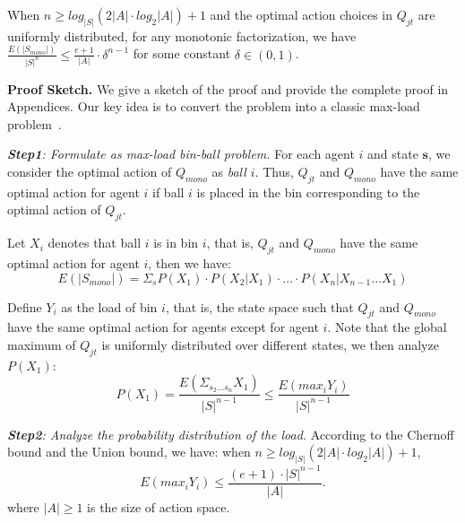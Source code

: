 {
\begin{theorem}
 When $n \geq log_{|S|}(2|A|\cdot log_2|A|) + 1$ and the optimal action choices in $Q_{jt}$ are uniformly distributed, for any monotonic factorization, we have
$\frac{E(|S_{mono}|)}{|S|^n} \leq \frac{e+1}{|A|}\cdot \delta^{n-1}$ for some constant $\delta\in(0,1)$.
\end{theorem}



\noindent\textbf{Proof  Sketch.} We give a sketch of the proof and provide the complete proof in Appendices. Our key idea is to convert the problem into a classic max-load problem~\cite{balls_into_bins}.

\noindent \textit{\textbf{Step1}: Formulate as max-load bin-ball problem.} For each agent $i$ and state $\mathbf{s}$, we consider the optimal action of $Q_{mono}$ as \textit{ball $i$}. Thus, $Q_{jt}$ and $Q_{mono}$ have the same optimal action for agent $i$ if ball $i$ is placed in the bin corresponding to the optimal action of $Q_{jt}$. 


Let $X_i$ denotes that ball $i$ is in bin $i$, that is,  $Q_{jt}$ and $Q_{mono}$ have the same optimal action for  agent $i$, then we have: 
\begin{equation}
    E(|S_{mono}|) = \Sigma_sP(X_1)\cdot P(X_2|X_1) \cdot...\cdot P(X_n|X_{n-1}...X_1) \nonumber
\label{S_mono}
\end{equation}

Define $Y_i$ as the load of bin $i$, that is, the state space such that $Q_{jt}$ and $Q_{mono}$ have the same optimal action for agents except for agent $i$.
Note that the global maximum of $Q_{jt}$ is uniformly distributed over different states, we then analyze $P(X_1)$:
\begin{equation}
P(X_1) =  \frac{E(\Sigma_{s_2...s_n}X_1)}{|S|^{n-1}}
\leq \frac{E(max_{i}Y_i)}{|S|^{n-1}}
\label{P_X_1}
\end{equation}

\noindent \noindent\textit{\textbf{Step2}: Analyze the probability distribution of the load.} According to the Chernoff bound and the Union bound, we have: when $n \geq log_{|S|}(2|A|\cdot log_2|A|) + 1$,
\begin{equation} 
E(max_{i}Y_i) \leq \frac{(e+1) \cdot {|S|^{n-1}}}{|A|}.
\label{maxY}
\end{equation}
where $|A| \geq 1$ is the size of action space. 

}
